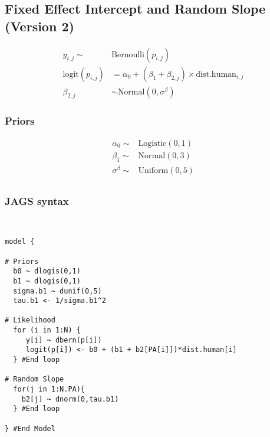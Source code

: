\documentclass[12pt]{article}
\begin{document}
\subsection{Fixed Effect Intercept and Random Slope (Version 2)}

\begin{align*}
y_{i,j}\sim& \text{Bernoulli}(p_{i,j})\\
\text{logit}(p_{i,j}) &= \alpha_{0} + (\beta_1 + \beta_{2,j}) \times \text{dist.human}_{i,j}\\
\beta_{2,j} &\sim \text{Normal}(0, \sigma^{\beta})
\end{align*}

\subsubsection{Priors}

\begin{align*}
\alpha_{0} \sim& \text{Logistic}(0, 1)\\
\beta_{1} \sim& \text{Normal}(0, 3)\\
\sigma^{\beta} \sim& \text{Uniform}(0, 5)\\
\end{align*}

\pagebreak

\subsubsection{JAGS syntax}

\begin{verbatim}


model {

# Priors
  b0 ~ dlogis(0,1)
  b1 ~ dlogis(0,1)
  sigma.b1 ~ dunif(0,5)
  tau.b1 <- 1/sigma.b1^2
  
# Likelihood
  for (i in 1:N) {
     y[i] ~ dbern(p[i])
     logit(p[i]) <- b0 + (b1 + b2[PA[i]])*dist.human[i]
  } #End loop
  
# Random Slope
  for(j in 1:N.PA){
    b2[j] ~ dnorm(0,tau.b1)
  } #End loop
  
} #End Model



\end{verbatim}
\end{document}
